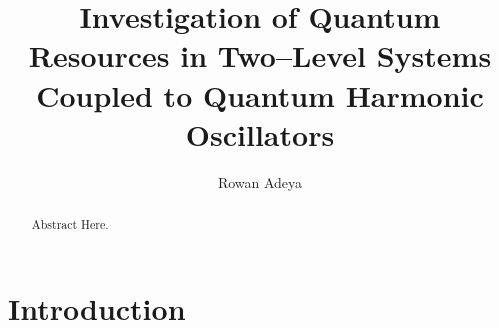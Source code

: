 \documentclass[12pt]{article}
\title{\textbf{Investigation of Quantum Resources in Two--Level Systems Coupled to Quantum Harmonic Oscillators}}
\author{Rowan Adeya}
\date{}
\begin{document}
\maketitle

\newpage

\vspace{\fill}
\begin{abstract}
    Abstract Here.
\end{abstract}
\vspace{\fill}

\newpage
{}
\tableofcontents

\newpage
\section{Introduction}
\end{document}
